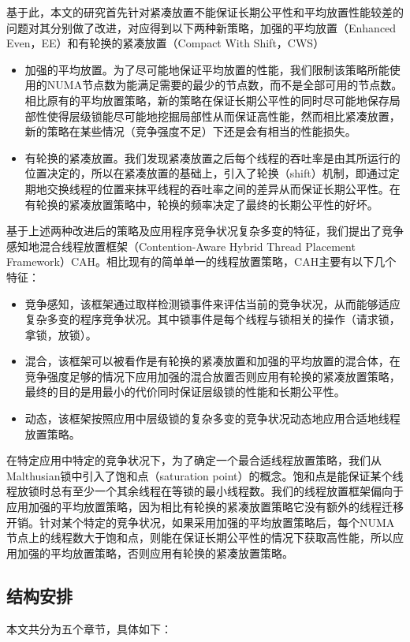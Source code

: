 基于此，本文的研究首先针对紧凑放置不能保证长期公平性和平均放置性能较差的问题对其分别做了改进，对应得到以下两种新策略，加强的平均放置（Enhanced Even，EE）和有轮换的紧凑放置（Compact With Shift，CWS）
\begin{itemize}
\item 加强的平均放置。为了尽可能地保证平均放置的性能，我们限制该策略所能使用的NUMA节点数为能满足需要的最少的节点数，而不是全部可用的节点数。相比原有的平均放置策略，新的策略在保证长期公平性的同时尽可能地保存局部性使得层级锁能尽可能地挖掘局部性从而保证高性能，然而相比紧凑放置，新的策略在某些情况（竞争强度不足）下还是会有相当的性能损失。
\item 有轮换的紧凑放置。我们发现紧凑放置之后每个线程的吞吐率是由其所运行的位置决定的，所以在紧凑放置的基础上，引入了轮换（shift）机制，即通过定期地交换线程的位置来抹平线程的吞吐率之间的差异从而保证长期公平性。在有轮换的紧凑放置策略中，轮换的频率决定了最终的长期公平性的好坏。
\end{itemize}
基于上述两种改进后的策略及应用程序竞争状况复杂多变的特征，我们提出了竞争感知地混合线程放置框架（Contention-Aware Hybrid Thread Placement Framework）CAH。相比现有的简单单一的线程放置策略，CAH主要有以下几个特征：
\begin{itemize}
\item 竞争感知，该框架通过取样检测锁事件来评估当前的竞争状况，从而能够适应复杂多变的程序竞争状况。其中锁事件是每个线程与锁相关的操作（请求锁，拿锁，放锁）。
\item 混合，该框架可以被看作是有轮换的紧凑放置和加强的平均放置的混合体，在竞争强度足够的情况下应用加强的混合放置否则应用有轮换的紧凑放置策略，最终的目的是用最小的代价同时保证层级锁的性能和长期公平性。
\item 动态，该框架按照应用中层级锁的复杂多变的竞争状况动态地应用合适地线程放置策略。
\end{itemize}

在特定应用中特定的竞争状况下，为了确定一个最合适线程放置策略，我们从Malthusian锁中引入了饱和点（saturation point）的概念。饱和点是能保证某个线程放锁时总有至少一个其余线程在等锁的最小线程数。我们的线程放置框架偏向于应用加强的平均放置策略，因为相比有轮换的紧凑放置策略它没有额外的线程迁移开销。针对某个特定的竞争状况，如果采用加强的平均放置策略后，每个NUMA节点上的线程数大于饱和点，则能在保证长期公平性的情况下获取高性能，所以应用加强的平均放置策略，否则应用有轮换的紧凑放置策略。
\subsection{结构安排}
本文共分为五个章节，具体如下：

